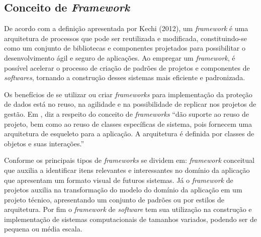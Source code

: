 \documentclass[
	12pt,				%
	openright,			%
	oneside,			%
	a4paper,			%
	english,			%
	french,				%
	spanish,			%
	brazil,				%
	]{abntex2}
\begin{document}
\subsection{Conceito de \textit{Framework}}

De acordo com a definição apresentada por Kechi (2012), um \textit{framework} é uma arquitetura de processos que pode ser reutilizada e modificada, constituindo-se como um conjunto de bibliotecas e componentes projetados para possibilitar o desenvolvimento ágil e seguro de aplicações. Ao empregar um \textit{framework}, é possível acelerar o processo de criação de padrões de projetos e componentes de \textit{softwares}, tornando a construção desses sistemas mais eficiente e padronizada.

Os benefícios de se utilizar ou criar \textit{frameworks} para implementação da proteção de dados está no reuso, na agilidade e na possibilidade de replicar nos projetos de gestão. Em , diz a respeito do conceito de \textit{frameworks} “dão suporte ao reuso de projeto, bem como ao reuso de classes específicas de sistema, pois fornecem uma arquitetura de esqueleto para a aplicação. A arquitetura é definida por classes de objetos e suas interações.” 

Conforme  os principais tipos de \textit{frameworks} se dividem em: \textit{framework} conceitual que auxilia a identificar itens relevantes e interessantes no domínio da aplicação que apresentam um formato visual de futuros sistemas. Já o \textit{framework} de projetos auxilia na transformação do modelo do domínio da aplicação em um projeto técnico, apresentando um conjunto de padrões ou por estilos de arquitetura. Por fim o \textit{framework} de \textit{software} tem sua utilização na construção e implementação de sistemas computacionais de tamanhos variados, podendo ser de pequena ou média escala.
\end{document}
